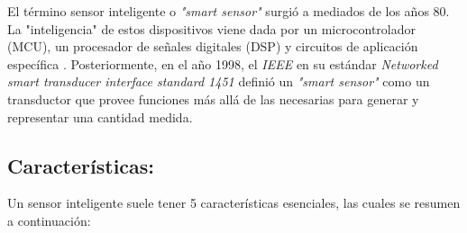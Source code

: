 El término sensor inteligente o \textit{"smart sensor"} surgió a mediados de los años 80. La "inteligencia" de estos dispositivos viene dada por un microcontrolador (MCU), un procesador de señales digitales (DSP) y circuitos de aplicación específica \citep{frank2002understanding}. Posteriormente, en el año 1998, el \textit{IEEE} en su estándar \textit{Networked smart transducer interface standard 1451} definió un \textit{"smart sensor"} como un transductor que provee funciones más allá de las necesarias para generar y representar una cantidad medida.


\subsection{Características:}

Un sensor inteligente suele tener 5 características esenciales, las cuales se resumen a continuación:

